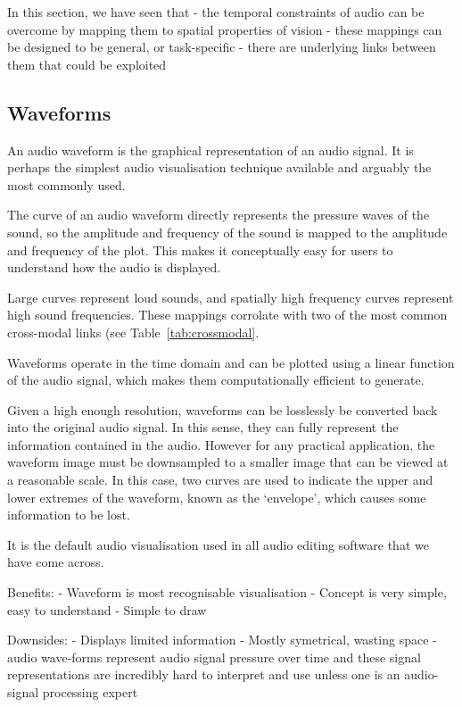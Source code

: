 
In this section, we have seen that
- the temporal constraints of audio can be overcome by mapping them to spatial properties of vision
- these mappings can be designed to be general, or task-specific
- there are underlying links between them that could be exploited

\subsection{Waveforms}

An audio waveform is the graphical representation of an audio signal. It is perhaps the simplest audio visualisation
technique available and arguably the most commonly used.

The curve of an audio waveform directly represents the pressure waves of the sound, so the amplitude and frequency of
the sound is mapped to the amplitude and frequency of the plot. This makes it conceptually easy for users to
understand how the audio is displayed.

Large curves represent loud sounds, and spatially high frequency curves represent high sound frequencies. These
mappings corrolate with two of the most common cross-modal links (see Table~\ref{tab:crossmodal}.

Waveforms operate in the time domain and can be plotted using a linear function of the audio signal, which makes them
computationally efficient to generate. 

Given a high enough resolution, waveforms can be losslessly be converted back into the original audio signal. In this
sense, they can fully represent the information contained in the audio. However for any practical application, the
waveform image must be downsampled to a smaller image that can be viewed at a reasonable scale. In this case, two
curves are used to indicate the upper and lower extremes of the waveform, known as the `envelope', which causes some
information to be lost.

It is the default audio visualisation used in all audio editing software that we have come across.

Benefits:
- Waveform is most recognisable visualisation
- Concept is very simple, easy to understand
- Simple to draw

Downsides:
- Displays limited information
- Mostly symetrical, wasting space
- audio wave-forms represent audio signal pressure over time and these signal representations are incredibly hard to interpret and use unless one is an audio-signal processing expert

